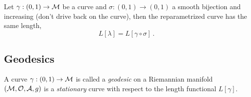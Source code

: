 \begin{theorem}
    Let $\gamma: (0,1)\to\mathcal{M}$ be a curve and
    $\sigma: (0,1)\to(0,1)$ a smooth bijection and increasing (don't drive back
    on the curve), then the reparametrized curve has the same length,
    \begin{equation}
        L[\lambda] = L[\gamma\circ\sigma]\,.
    \end{equation}
\end{theorem}

\subsection{Geodesics}
\begin{defn}[Geodesic]
    A curve $\gamma: (0,1) \to \mathcal{M}$ is called a \textit{geodesic} on a
    Riemannian manifold $(\mathcal{M}, \mathcal{O}, \mathcal{A}, g)$ is a \textit{stationary}
    curve with respect to the length functional $L[\gamma]$.
\end{defn}

